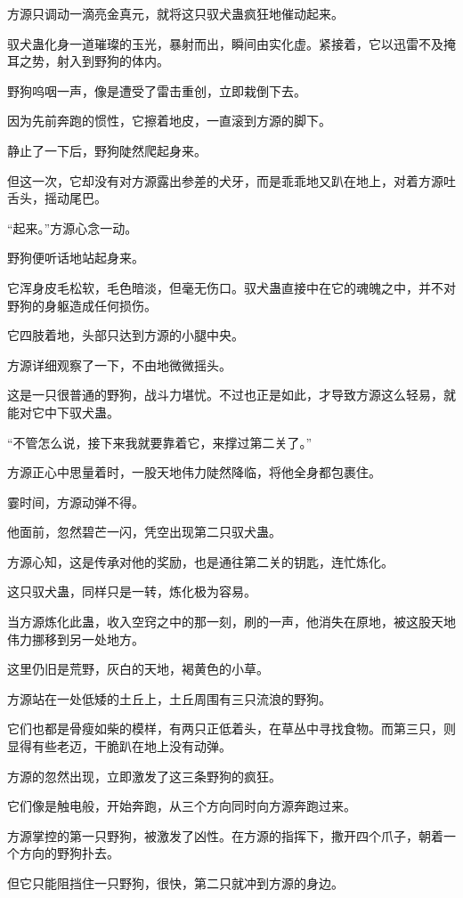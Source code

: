 \begin{this_body}
方源只调动一滴亮金真元，就将这只驭犬蛊疯狂地催动起来。

驭犬蛊化身一道璀璨的玉光，暴射而出，瞬间由实化虚。紧接着，它以迅雷不及掩耳之势，射入到野狗的体内。

野狗呜咽一声，像是遭受了雷击重创，立即栽倒下去。

因为先前奔跑的惯性，它擦着地皮，一直滚到方源的脚下。

静止了一下后，野狗陡然爬起身来。

但这一次，它却没有对方源露出参差的犬牙，而是乖乖地又趴在地上，对着方源吐舌头，摇动尾巴。

“起来。”方源心念一动。

野狗便听话地站起身来。

它浑身皮毛松软，毛色暗淡，但毫无伤口。驭犬蛊直接中在它的魂魄之中，并不对野狗的身躯造成任何损伤。

它四肢着地，头部只达到方源的小腿中央。

方源详细观察了一下，不由地微微摇头。

这是一只很普通的野狗，战斗力堪忧。不过也正是如此，才导致方源这么轻易，就能对它中下驭犬蛊。

“不管怎么说，接下来我就要靠着它，来撑过第二关了。”

方源正心中思量着时，一股天地伟力陡然降临，将他全身都包裹住。

霎时间，方源动弹不得。

他面前，忽然碧芒一闪，凭空出现第二只驭犬蛊。

方源心知，这是传承对他的奖励，也是通往第二关的钥匙，连忙炼化。

这只驭犬蛊，同样只是一转，炼化极为容易。

当方源炼化此蛊，收入空窍之中的那一刻，刷的一声，他消失在原地，被这股天地伟力挪移到另一处地方。

这里仍旧是荒野，灰白的天地，褐黄色的小草。

方源站在一处低矮的土丘上，土丘周围有三只流浪的野狗。

它们也都是骨瘦如柴的模样，有两只正低着头，在草丛中寻找食物。而第三只，则显得有些老迈，干脆趴在地上没有动弹。

方源的忽然出现，立即激发了这三条野狗的疯狂。

它们像是触电般，开始奔跑，从三个方向同时向方源奔跑过来。

方源掌控的第一只野狗，被激发了凶性。在方源的指挥下，撒开四个爪子，朝着一个方向的野狗扑去。

但它只能阻挡住一只野狗，很快，第二只就冲到方源的身边。


\end{this_body}
